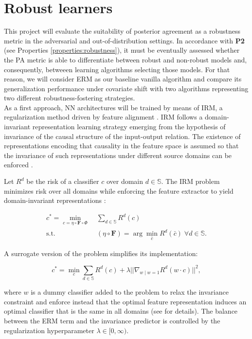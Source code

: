 \section{Robust learners}\label{sec:robust_learners}

This project will evaluate the suitability of posterior agreement as a robustness
metric in the adversarial and out-of-distribution settings. In accordance with
\textbf{P2} (see Properties \ref{properties:robustness}), it must be eventually
assessed whether the PA metric is able to differentiate between robust and non-robust
models and, consequently, betweeen learning algorithms selecting those models.
For that reason, we will consider ERM as our baseline vanilla algorithm and compare its 
generalization performance under covariate shift with two algorithms representing two 
different robustness-fostering strategies. \\

As a first approach, NN architectures will be trained by means of IRM, a regularization method driven 
by feature alignment \cite{arjovskyInvariantRiskMinimization2020}.
IRM follows a domain-invariant representation 
learning strategy emerging from the hypothesis of invariance of the 
causal structure of the input-output relation. The existence of 
representations encoding that causality in the feature space is assumed so 
that the invariance of such representations
under different source domains can be enforced
\cite{liuOutOfDistributionGeneralizationSurvey2023}.

\begin{definition}
    Let $R^d$ be the risk of a classifier $c$
    over domain $d \in \mathbb{S}$. The IRM problem minimizes risk over all domains
    while enforcing the feature extractor to yield domain-invariant representations
    \cite{arjovskyInvariantRiskMinimization2020}:

    $$
        \begin{aligned}
            c^* = \min_{c = \eta \circ \bm{F} \circ \Phi} & \; \sum_{d \in \mathbb{S}} R^d(c) \\
            \text{s.t.} & \; (\eta \circ \bm{F}) = \arg \min_{\bar{c}} R^d(\bar{c}) \; \forall d \in \mathbb{S}.
        \end{aligned}
    $$

    A surrogate version of the problem simplifies its implementation:

    $$
        c^* = \min_{c} \sum_{d \in \mathbb{S}} R^d(c) + \lambda || \nabla_{w \mid w = 1} R^d(w \cdot c) ||^2,
    $$

    where $w$ is a dummy classifier added to the problem to relax the invariance
    constraint and enforce instead that the optimal feature representation induces
    an optimal classifier that is the same in all domains (see
    \cite{arjovskyInvariantRiskMinimization2020} for details). The balance between
    the ERM term and the invariance predictor is controlled by
    the regularization hyperparameter $\lambda \in [0, \infty)$.
\end{definition}

